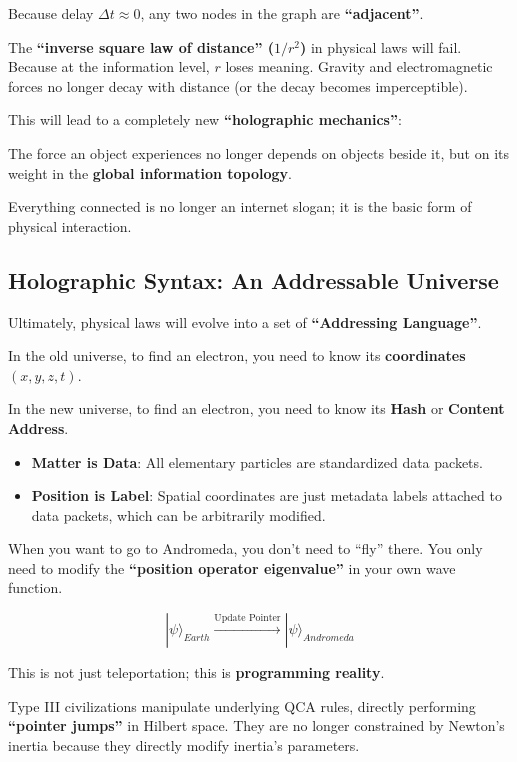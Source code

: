 Because delay $\Delta t \approx 0$, any two nodes in the graph are \textbf{``adjacent''}.

The \textbf{``inverse square law of distance'' ($1/r^2$)} in physical laws will fail. Because at the information level, $r$ loses meaning. Gravity and electromagnetic forces no longer decay with distance (or the decay becomes imperceptible).

This will lead to a completely new \textbf{``holographic mechanics''}:

The force an object experiences no longer depends on objects beside it, but on its weight in the \textbf{global information topology}.

Everything connected is no longer an internet slogan; it is the basic form of physical interaction.

\subsection{Holographic Syntax: An Addressable Universe}

Ultimately, physical laws will evolve into a set of \textbf{``Addressing Language''}.

In the old universe, to find an electron, you need to know its \textbf{coordinates $(x, y, z, t)$}.

In the new universe, to find an electron, you need to know its \textbf{Hash} or \textbf{Content Address}.

\begin{itemize}
\item \textbf{Matter is Data}: All elementary particles are standardized data packets.

\item \textbf{Position is Label}: Spatial coordinates are just metadata labels attached to data packets, which can be arbitrarily modified.
\end{itemize}

When you want to go to Andromeda, you don't need to ``fly'' there. You only need to modify the \textbf{``position operator eigenvalue''} in your own wave function.

\[|\psi\rangle_{Earth} \xrightarrow{\text{Update Pointer}} |\psi\rangle_{Andromeda}\]

This is not just teleportation; this is \textbf{programming reality}.

Type III civilizations manipulate underlying QCA rules, directly performing \textbf{``pointer jumps''} in Hilbert space. They are no longer constrained by Newton's inertia because they directly modify inertia's parameters.


